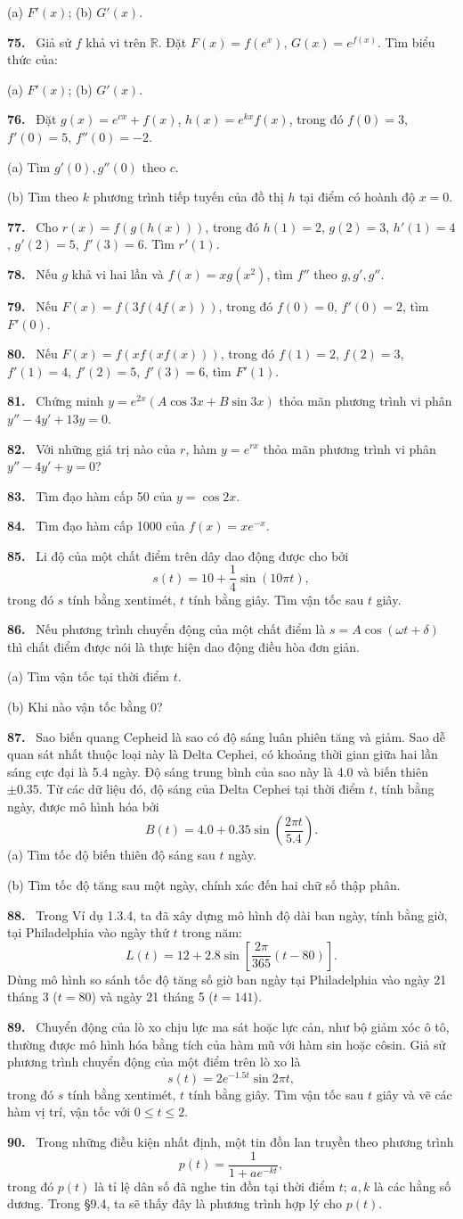 \documentclass[12pt,a4paper]{article}
\newcommand{\bt}[1]{\par\smallskip\noindent\textbf{#1.}\ }
\begin{document}
(a) $F'(x)$; \qquad (b) $G'(x)$.
\bt{75} Giả sử $f$ khả vi trên $\mathbb R$. Đặt $F(x)=f(e^x)$, $G(x)=e^{f(x)}$. Tìm biểu thức của:

(a) $F'(x)$; \qquad (b) $G'(x)$.
\bt{76} Đặt $g(x)=e^{cx}+f(x)$, $h(x)=e^{kx}f(x)$, trong đó $f(0)=3$, $f'(0)=5$, $f''(0)=-2$.

(a) Tìm $g'(0),g''(0)$ theo $c$.

(b) Tìm theo $k$ phương trình tiếp tuyến của đồ thị $h$ tại điểm có hoành độ $x=0$.
\bt{77} Cho $r(x)=f(g(h(x)))$, trong đó $h(1)=2$, $g(2)=3$, $h'(1)=4$, $g'(2)=5$, $f'(3)=6$. Tìm $r'(1)$.
\bt{78} Nếu $g$ khả vi hai lần và $f(x)=xg(x^2)$, tìm $f''$ theo $g,g',g''$.
\bt{79} Nếu $F(x)=f(3f(4f(x)))$, trong đó $f(0)=0$, $f'(0)=2$, tìm $F'(0)$.
\bt{80} Nếu $F(x)=f(xf(xf(x)))$, trong đó $f(1)=2$, $f(2)=3$, $f'(1)=4$, $f'(2)=5$, $f'(3)=6$, tìm $F'(1)$.
\bt{81} Chứng minh $y=e^{2x}(A\cos3x+B\sin3x)$ thỏa mãn phương trình vi phân $y''-4y'+13y=0$.
\bt{82} Với những giá trị nào của $r$, hàm $y=e^{rx}$ thỏa mãn phương trình vi phân $y''-4y'+y=0$?
\bt{83} Tìm đạo hàm cấp 50 của $y=\cos2x$.
\bt{84} Tìm đạo hàm cấp 1000 của $f(x)=xe^{-x}$.
\bt{85} Li độ của một chất điểm trên dây dao động được cho bởi
\[s(t)=10+\frac14\sin(10\pi t),\]
trong đó $s$ tính bằng xentimét, $t$ tính bằng giây. Tìm vận tốc sau $t$ giây.
\bt{86} Nếu phương trình chuyển động của một chất điểm là $s=A\cos(\omega t+\delta)$ thì chất điểm được nói là thực hiện dao động điều hòa đơn giản.

(a) Tìm vận tốc tại thời điểm $t$.

(b) Khi nào vận tốc bằng 0?
\bt{87} Sao biến quang Cepheid là sao có độ sáng luân phiên tăng và giảm. Sao dễ quan sát nhất thuộc loại này là Delta Cephei, có khoảng thời gian giữa hai lần sáng cực đại là 5.4 ngày. Độ sáng trung bình của sao này là 4.0 và biến thiên $\pm0.35$. Từ các dữ liệu đó, độ sáng của Delta Cephei tại thời điểm $t$, tính bằng ngày, được mô hình hóa bởi
\[B(t)=4.0+0.35\sin\left(\frac{2\pi t}{5.4}\right).\]
(a) Tìm tốc độ biến thiên độ sáng sau $t$ ngày.

(b) Tìm tốc độ tăng sau một ngày, chính xác đến hai chữ số thập phân.
\bt{88} Trong Ví dụ 1.3.4, ta đã xây dựng mô hình độ dài ban ngày, tính bằng giờ, tại Philadelphia vào ngày thứ $t$ trong năm:
\[L(t)=12+2.8\sin\left[\frac{2\pi}{365}(t-80)\right].\]
Dùng mô hình so sánh tốc độ tăng số giờ ban ngày tại Philadelphia vào ngày 21 tháng 3 ($t=80$) và ngày 21 tháng 5 ($t=141$).
\bt{89} Chuyển động của lò xo chịu lực ma sát hoặc lực cản, như bộ giảm xóc ô tô, thường được mô hình hóa bằng tích của hàm mũ với hàm sin hoặc côsin. Giả sử phương trình chuyển động của một điểm trên lò xo là
\[s(t)=2e^{-1.5t}\sin2\pi t,\]
trong đó $s$ tính bằng xentimét, $t$ tính bằng giây. Tìm vận tốc sau $t$ giây và vẽ các hàm vị trí, vận tốc với $0\le t\le2$.
\bt{90} Trong những điều kiện nhất định, một tin đồn lan truyền theo phương trình
\[p(t)=\frac1{1+ae^{-kt}},\]
trong đó $p(t)$ là tỉ lệ dân số đã nghe tin đồn tại thời điểm $t$; $a,k$ là các hằng số dương. Trong §9.4, ta sẽ thấy đây là phương trình hợp lý cho $p(t)$.
\end{document}
